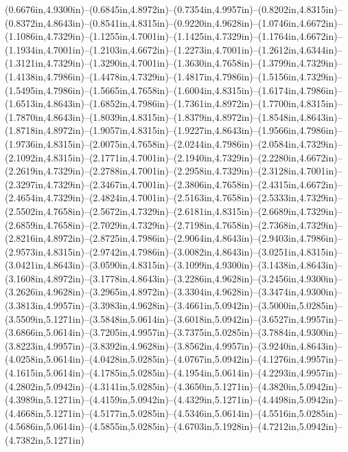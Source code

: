 (0.6676in,4.9300in)--(0.6845in,4.8972in)--(0.7354in,4.9957in)--(0.8202in,4.8315in)--(0.8372in,4.8643in)--(0.8541in,4.8315in)--(0.9220in,4.9628in)--(1.0746in,4.6672in)--(1.1086in,4.7329in)--(1.1255in,4.7001in)--(1.1425in,4.7329in)--(1.1764in,4.6672in)--(1.1934in,4.7001in)--(1.2103in,4.6672in)--(1.2273in,4.7001in)--(1.2612in,4.6344in)--(1.3121in,4.7329in)--(1.3290in,4.7001in)--(1.3630in,4.7658in)--(1.3799in,4.7329in)--(1.4138in,4.7986in)--(1.4478in,4.7329in)--(1.4817in,4.7986in)--(1.5156in,4.7329in)--(1.5495in,4.7986in)--(1.5665in,4.7658in)--(1.6004in,4.8315in)--(1.6174in,4.7986in)--(1.6513in,4.8643in)--(1.6852in,4.7986in)--(1.7361in,4.8972in)--(1.7700in,4.8315in)--(1.7870in,4.8643in)--(1.8039in,4.8315in)--(1.8379in,4.8972in)--(1.8548in,4.8643in)--(1.8718in,4.8972in)--(1.9057in,4.8315in)--(1.9227in,4.8643in)--(1.9566in,4.7986in)--(1.9736in,4.8315in)--(2.0075in,4.7658in)--(2.0244in,4.7986in)--(2.0584in,4.7329in)--(2.1092in,4.8315in)--(2.1771in,4.7001in)--(2.1940in,4.7329in)--(2.2280in,4.6672in)--(2.2619in,4.7329in)--(2.2788in,4.7001in)--(2.2958in,4.7329in)--(2.3128in,4.7001in)--(2.3297in,4.7329in)--(2.3467in,4.7001in)--(2.3806in,4.7658in)--(2.4315in,4.6672in)--(2.4654in,4.7329in)--(2.4824in,4.7001in)--(2.5163in,4.7658in)--(2.5333in,4.7329in)--(2.5502in,4.7658in)--(2.5672in,4.7329in)--(2.6181in,4.8315in)--(2.6689in,4.7329in)--(2.6859in,4.7658in)--(2.7029in,4.7329in)--(2.7198in,4.7658in)--(2.7368in,4.7329in)--(2.8216in,4.8972in)--(2.8725in,4.7986in)--(2.9064in,4.8643in)--(2.9403in,4.7986in)--(2.9573in,4.8315in)--(2.9742in,4.7986in)--(3.0082in,4.8643in)--(3.0251in,4.8315in)--(3.0421in,4.8643in)--(3.0590in,4.8315in)--(3.1099in,4.9300in)--(3.1438in,4.8643in)--(3.1608in,4.8972in)--(3.1778in,4.8643in)--(3.2286in,4.9628in)--(3.2456in,4.9300in)--(3.2626in,4.9628in)--(3.2965in,4.8972in)--(3.3304in,4.9628in)--(3.3474in,4.9300in)--(3.3813in,4.9957in)--(3.3983in,4.9628in)--(3.4661in,5.0942in)--(3.5000in,5.0285in)--(3.5509in,5.1271in)--(3.5848in,5.0614in)--(3.6018in,5.0942in)--(3.6527in,4.9957in)--(3.6866in,5.0614in)--(3.7205in,4.9957in)--(3.7375in,5.0285in)--(3.7884in,4.9300in)--(3.8223in,4.9957in)--(3.8392in,4.9628in)--(3.8562in,4.9957in)--(3.9240in,4.8643in)--(4.0258in,5.0614in)--(4.0428in,5.0285in)--(4.0767in,5.0942in)--(4.1276in,4.9957in)--(4.1615in,5.0614in)--(4.1785in,5.0285in)--(4.1954in,5.0614in)--(4.2293in,4.9957in)--(4.2802in,5.0942in)--(4.3141in,5.0285in)--(4.3650in,5.1271in)--(4.3820in,5.0942in)--(4.3989in,5.1271in)--(4.4159in,5.0942in)--(4.4329in,5.1271in)--(4.4498in,5.0942in)--(4.4668in,5.1271in)--(4.5177in,5.0285in)--(4.5346in,5.0614in)--(4.5516in,5.0285in)--(4.5686in,5.0614in)--(4.5855in,5.0285in)--(4.6703in,5.1928in)--(4.7212in,5.0942in)--(4.7382in,5.1271in) 